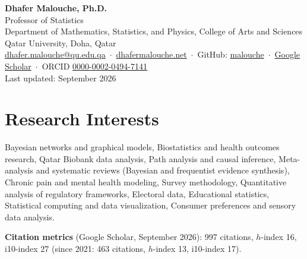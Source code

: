 \documentclass[10pt,a4paper]{article}
\begin{document}
\begin{center}
{\LARGE\bfseries Dhafer Malouche, Ph.D.}\\[3pt]
{\large Professor of Statistics}\\[2pt]
Department of Mathematics, Statistics, and Physics, College of Arts and Sciences\\
Qatar University, Doha, Qatar\\[3pt]
\href{mailto:dhafer.malouche@qu.edu.qa}{dhafer.malouche@qu.edu.qa} \,$\cdot$\,
\href{https://dhafermalouche.net}{dhafermalouche.net} \,$\cdot$\,
GitHub: \href{https://github.com/malouche}{malouche} \,$\cdot$\,
\href{https://scholar.google.com/citations?user=LcucwHsAAAAJ&hl=en}{Google Scholar} \,$\cdot$\,
ORCID \href{https://orcid.org/0000-0002-0494-7141}{0000-0002-0494-7141}\\[2pt]
{\small Last updated: September 2026}
\end{center}

\section{Research Interests}
Bayesian networks and graphical models, Biostatistics and health outcomes research, Qatar Biobank data analysis,
Path analysis and causal inference, Meta-analysis and systematic reviews (Bayesian and frequentist evidence synthesis),
Chronic pain and mental health modeling, Survey methodology, Quantitative analysis of regulatory frameworks,
Electoral data, Educational statistics, Statistical computing and data visualization,
Consumer preferences and sensory data analysis.

\textbf{Citation metrics} (Google Scholar, September 2026): 997 citations, $h$-index 16, i10-index 27
(since 2021: 463 citations, $h$-index 13, i10-index 17).

\end{document}
